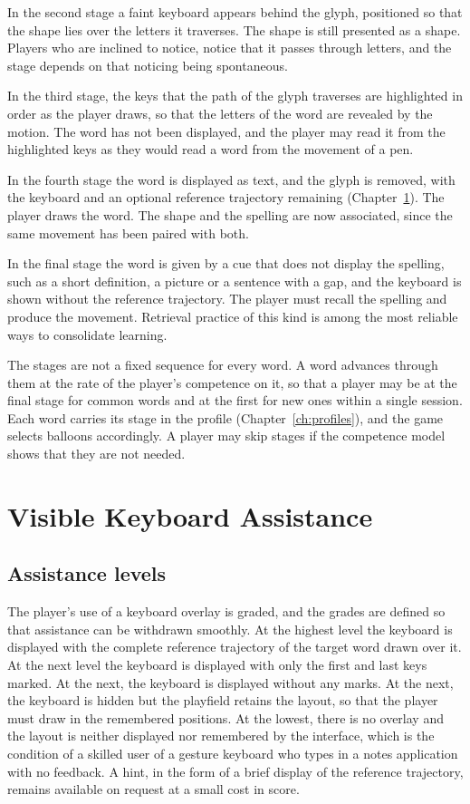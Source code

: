 In the second stage a faint keyboard appears behind the glyph, positioned so that the shape lies over the letters it traverses. The shape is still presented as a shape. Players who are inclined to notice, notice that it passes through letters, and the stage depends on that noticing being spontaneous.

In the third stage, the keys that the path of the glyph traverses are highlighted in order as the player draws, so that the letters of the word are revealed by the motion. The word has not been displayed, and the player may read it from the highlighted keys as they would read a word from the movement of a pen.

In the fourth stage the word is displayed as text, and the glyph is removed, with the keyboard and an optional reference trajectory remaining (Chapter~\ref{ch:keyboard-assistance}). The player draws the word. The shape and the spelling are now associated, since the same movement has been paired with both.

In the final stage the word is given by a cue that does not display the spelling, such as a short definition, a picture or a sentence with a gap, and the keyboard is shown without the reference trajectory. The player must recall the spelling and produce the movement. Retrieval practice of this kind is among the most reliable ways to consolidate learning.\evD{}

The stages are not a fixed sequence for every word. A word advances through them at the rate of the player's competence on it, so that a player may be at the final stage for common words and at the first for new ones within a single session. Each word carries its stage in the profile (Chapter~\ref{ch:profiles}), and the game selects balloons accordingly. A player may skip stages if the competence model shows that they are not needed.\evS

\chapter{Visible Keyboard Assistance}\label{ch:keyboard-assistance}

\section{Assistance levels}

The player's use of a keyboard overlay is graded, and the grades are defined so that assistance can be withdrawn smoothly. At the highest level the keyboard is displayed with the complete reference trajectory of the target word drawn over it. At the next level the keyboard is displayed with only the first and last keys marked. At the next, the keyboard is displayed without any marks. At the next, the keyboard is hidden but the playfield retains the layout, so that the player must draw in the remembered positions. At the lowest, there is no overlay and the layout is neither displayed nor remembered by the interface, which is the condition of a skilled user of a gesture keyboard who types in a notes application with no feedback. A hint, in the form of a brief display of the reference trajectory, remains available on request at a small cost in score.

